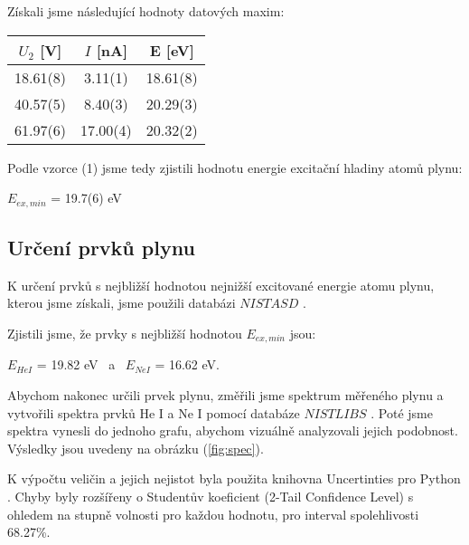 \documentclass[a4paper,11pt]{article}
\begin{document}
    \hspace{10pt}
    \begin{minipage}[t]{0.5\textwidth} 
                Získali jsme následující hodnoty datových maxim: 
                \begin{center}
                    \begin{tabular}{c|c|c}
                        \hline
                        $U_2$ [V] & $I$ [nA] & E [eV] \\
                        \hline
                        18.61(8) & 3.11(1) & 18.61(8) \\
                        40.57(5) & 8.40(3) & 20.29(3) \\
                        61.97(6) & 17.00(4) & 20.32(2) \\
                        \hline
                    \end{tabular}
                \end{center}

                Podle vzorce (1) jsme tedy zjistili hodnotu energie excitační hladiny atomů plynu:
                \begin{center}
                    $E_{ex, min}$ = 19.7(6) eV
                \end{center}

            \subsection{Určení prvků plynu}
                K určení prvků s nejbližší hodnotou nejnižší excitované energie atomu plynu, kterou jsme získali, jsme použili databázi $NIST ASD$ \cite{nist_ads}.
                \par Zjistili jsme, že prvky s nejbližší hodnotou $E_{ex, min}$ jsou:
                \begin{center}
                    $E_{He I}$ = 19.82 eV ~a~ $E_{Ne I}$ = 16.62 eV.
                \end{center}

                Abychom nakonec určili prvek plynu, změřili jsme spektrum měřeného plynu a vytvořili spektra prvků He I a Ne I pomocí databáze $NIST LIBS$ \cite{nist_libs}. Poté jsme spektra vynesli do jednoho grafu, abychom vizuálně analyzovali jejich podobnost. Výsledky jsou uvedeny na obrázku (\ref{fig:spec}). 

                \par K výpočtu veličin a jejich nejistot byla použita knihovna Uncertinties pro Python \cite{uncertainties}. Chyby byly rozšířeny o Studentův koeficient (2-Tail Confidence Level) s ohledem na stupně volnosti pro každou hodnotu, pro interval spolehlivosti 68.27\%.


\end{minipage}
\end{document}
